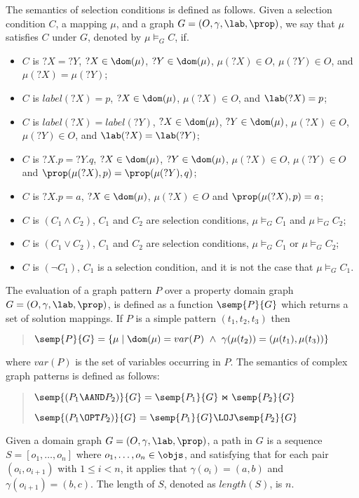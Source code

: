 The semantics of selection conditions is defined as follows. 
Given a selection condition $C$, a mapping $\mu$, and a graph $G=(O,\gamma,\lab,\prop)$, we say that $\mu$ satisfies $C$ under $G$, denoted by $\mu \models_G C$, if.  
\begin{itemize}
\item 
$C$ is ${?X} = {?Y}$, $?X \in \dom(\mu)$, $?Y \in \dom(\mu)$, $\mu(?X) \in O$, $\mu(?Y) \in O$, and $\mu(?X) = \mu(?Y)$;
\item 
$C$ is ${label(?X)} = {p}$, $?X \in \dom(\mu)$, $\mu(?X) \in O$, and $\lab(?X) = p$; 
\item 
$C$ is ${label(?X)} = {label(?Y)}$, $?X \in \dom(\mu)$, $?Y \in \dom(\mu)$, $\mu(?X) \in O$, $\mu(?Y) \in O$, and $\lab(?X) = \lab(?Y)$; 
\item 
$C$ is ${?X.p} = {?Y.q}$, $?X \in \dom(\mu)$, $?Y \in \dom(\mu)$, $\mu(?X) \in O$, $\mu(?Y) \in O$ and $\prop(\mu(?X),p) = \prop(\mu(?Y),q)$;
\item 
$C$ is ${?X.p} = {a}$, $?X \in \dom(\mu)$, $\mu(?X) \in O$ and $\prop(\mu(?X),p) = a$;
\item
$C$ is $(C_1 \land C_2)$, $C_1$ and $C_2$ are selection conditions, $\mu \models_G C_1$ and $\mu \models_G C_2$; 
\item
$C$ is $(C_1 \lor C_2)$, $C_1$ and $C_2$ are selection conditions, $\mu \models_G C_1$ or $\mu \models_G C_2$; 
\item
$C$ is $(\neg C_1)$, $C_1$ is a selection condition, and it is not the case that $\mu \models_G C_1$. 
\end{itemize}

The evaluation of a graph pattern $P$ over a property domain graph $G=(O,\gamma,\lab,\prop)$, is defined as a function $\semp{P}{G}$ which returns a set of solution mappings. 
If $P$ is a simple pattern $(t_1, t_2, t_3)$ then 
\begin{verse}
$\semp{P}{G} = \{ \mu \mid \dom(\mu) = var(P) ~\land~ \gamma(\mu(t_2)) = (\mu(t_1), \mu(t_3)) \}$  
\end{verse}
where $var(P)$ is the set of variables occurring in $P$.
The semantics of complex graph patterns is defined as follows:
\begin{verse}
$\semp{(P_1 \AAND P_2)}{G} = \semp{P_1}{G} \Join \semp{P_2}{G}$

$\semp{(P_1 \OPT P_2)}{G} = \semp{P_1}{G} \LOJ \semp{P_2}{G}$
\end{verse}

Given a domain graph $G=(O,\gamma,\lab,\prop)$, a path in $G$ is a sequence $ S = [o_1, \dots, o_n] $ where $o_1, \dots, o_n \in \objs$, and satisfying that for each pair $(o_i, o_{i+1})$ with $1 \leq i < n$, it applies that $\gamma(o_i) = (a,b)$ and $\gamma(o_{i+1})=(b,c)$. The length of $S$, denoted as $length(S)$, is $n$. 




















